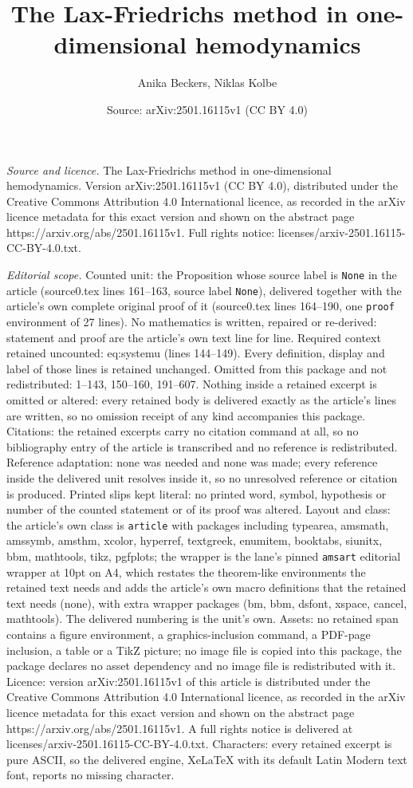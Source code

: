 \documentclass[10pt,a4paper]{amsart}
\title[The Lax-Friedrichs method in one-dimensional hemodynamics]{The Lax-Friedrichs method in one-dimensional hemodynamics}
\author{Anika Beckers, Niklas Kolbe}
\date{Source: arXiv:2501.16115v1 (CC BY 4.0)}
\begin{document}
\maketitle

\noindent\emph{Source and licence.} The Lax-Friedrichs method in one-dimensional hemodynamics. Version arXiv:2501.16115v1 (CC BY 4.0), distributed under the Creative Commons Attribution 4.0 International licence, as recorded in the arXiv licence metadata for this exact version and shown on the abstract page https://arxiv.org/abs/2501.16115v1. Full rights notice: licenses/arxiv-2501.16115-CC-BY-4.0.txt.\par\smallskip

\noindent\textit{Editorial scope.} Counted unit: the Proposition whose source label is \texttt{None} in the article (source0.tex lines 161--163, source label \texttt{None}), delivered together with the article's own complete original proof of it (source0.tex lines 164--190, one \texttt{proof} environment of 27 lines). No mathematics is written, repaired or re-derived: statement and proof are the article's own text line for line. Required context retained uncounted: eq:systemu (lines 144--149). Every definition, display and label of those lines is retained unchanged. Omitted from this package and not redistributed: 1--143, 150--160, 191--607. Nothing inside a retained excerpt is omitted or altered: every retained body is delivered exactly as the article's lines are written, so no omission receipt of any kind accompanies this package. Citations: the retained excerpts carry no citation command at all, so no bibliography entry of the article is transcribed and no reference is redistributed. Reference adaptation: none was needed and none was made; every reference inside the delivered unit resolves inside it, so no unresolved reference or citation is produced. Printed slips kept literal: no printed word, symbol, hypothesis or number of the counted statement or of its proof was altered. Layout and class: the article's own class is \texttt{article} with packages including typearea, amsmath, amssymb, amsthm, xcolor, hyperref, textgreek, enumitem, booktabs, siunitx, bbm, mathtools, tikz, pgfplots; the wrapper is the lane's pinned \texttt{amsart} editorial wrapper at 10pt on A4, which restates the theorem-like environments the retained text needs and adds the article's own macro definitions that the retained text needs (none), with extra wrapper packages (bm, bbm, dsfont, xspace, cancel, mathtools). The delivered numbering is the unit's own. Assets: no retained span contains a figure environment, a graphics-inclusion command, a PDF-page inclusion, a table or a TikZ picture; no image file is copied into this package, the package declares no asset dependency and no image file is redistributed with it. Licence: version arXiv:2501.16115v1 of this article is distributed under the Creative Commons Attribution 4.0 International licence, as recorded in the arXiv licence metadata for this exact version and shown on the abstract page https://arxiv.org/abs/2501.16115v1. A full rights notice is delivered at licenses/arxiv-2501.16115-CC-BY-4.0.txt. Characters: every retained excerpt is pure ASCII, so the delivered engine, XeLaTeX with its default Latin Modern text font, reports no missing character.
\end{document}
